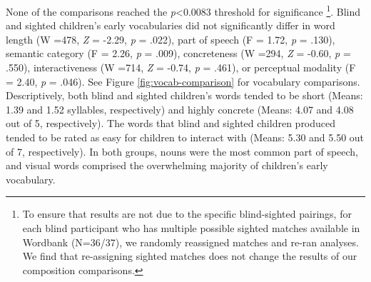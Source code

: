 \documentclass[
  man,floatsintext]{apa6}
\begin{document}
None of the comparisons reached the \emph{p}\textless0.0083 threshold for significance \footnote{To ensure that results are not due to the specific blind-sighted pairings, for each blind participant who has multiple possible sighted matches available in Wordbank (N=36/37), we randomly reassigned matches and re-ran analyses. We find that re-assigning sighted matches does not change the results of our composition comparisons.}. Blind and sighted children's early vocabularies did not significantly differ in word length (W =478, \emph{Z} = -2.29, \emph{p} = .022), part of speech (F = 1.72, \emph{p} = .130), semantic category (F = 2.26, \emph{p} = .009), concreteness (W =294, \emph{Z} = -0.60, \emph{p} = .550), interactiveness (W =714, \emph{Z} = -0.74, \emph{p} = .461), or perceptual modality (F = 2.40, \emph{p} = .046). See Figure \ref{fig:vocab-comparison} for vocabulary comparisons. Descriptively, both blind and sighted children's words tended to be short (Means: 1.39 and 1.52 syllables, respectively) and highly concrete (Means: 4.07 and 4.08 out of 5, respectively). The words that blind and sighted children produced tended to be rated as easy for children to interact with (Means: 5.30 and 5.50 out of 7, respectively). In both groups, nouns were the most common part of speech, and visual words comprised the overwhelming majority of children's early vocabulary.
\end{document}
